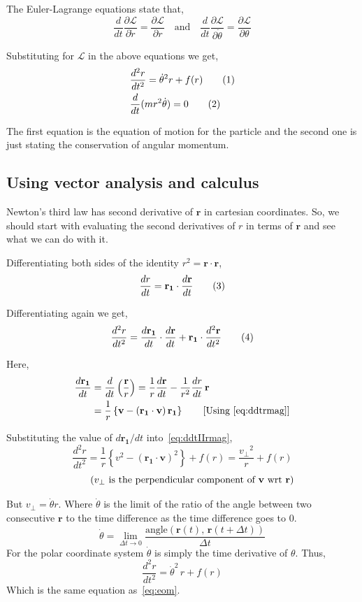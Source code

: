\documentclass[a4paper, 12pt]{article}
\renewcommand{\indent}{\hspace{3ex}}
\newcommand\labelthis[1]{\addtocounter{equation}{1}\tag{\theequation}\label{#1}}
\renewcommand{\r}{\mathbf{r}}
\newcommand{\ru}{\mathbf{r_1}}
\renewcommand{\v}{\mathbf{v}}
\newcommand{\ddt}[1]{\frac{d#1}{dt}}
\newcommand{\ddtII}[1]{\frac{d^2#1}{dt^2}}
\newcommand{\Lagr}{\mathcal{L}}
\begin{document}
The Euler-Lagrange equations state that,
\[	\ddt{} \frac{\partial \Lagr}{\partial \dot{r}} = \frac{\partial \Lagr}{\partial r} \quad\text{and}\quad
\ddt{} \frac{\partial \Lagr}{\partial \dot{\theta}} = \frac{\partial \Lagr}{\partial \theta} \]

Substituting for $\Lagr$ in the above equations we get,
\begin{align}
	&\ddtII{r} = \dot{\theta}^2 r + f(r) \labelthis{eq:eom} \\
	&\ddt{} (m r^2 \dot{\theta}) = 0 \labelthis{eq:conserv L lagrangian}
\end{align}

The first equation is the equation of motion for the particle and the second one is just stating the conservation of angular momentum.

\subsection{Using vector analysis and calculus}\label{eom vector calculus}

\indent Newton's third law has second derivative of $\r$ in cartesian coordinates. So, we should start with evaluating the second derivatives of $r$ in terms of $\r$ and see what we can do with it.

\medskip Differentiating both sides of the identity $r^2 = \r \cdot \r$,
\[ \ddt{r} = \ru \cdot \ddt{\r} \labelthis{eq:ddtrmag} \]

Differentiating again we get,
\[ \ddtII{r} = \ddt{\ru} \cdot \ddt{\r} + \ru \cdot \ddtII{\r} \labelthis{eq:ddtIIrmag} \]

Here,
\begin{align*}
	\ddt{\ru} &= \ddt{} \left( {\frac{\r}{r}} \right) = \frac{1}{r} \ddt{\r} - \frac{1}{r^2} \ddt{r} \, \r \\
			  &= \frac{1}{r} \left\{ \v - \left( \ru \cdot \v \right) \ru \right\} \tag*{[Using~\eqref{eq:ddtrmag}]}
\end{align*}

Substituting the value of $d\ru/dt$ into~\eqref{eq:ddtIIrmag},
\[ \ddtII{r} = \frac{1}{r} \left\{ v^2 - {\left( \ru \cdot \v \right)}^2 \right\} + f(r)
																					= \frac{{v_\bot}^2}{r} + f(r) \]
\[ \tag{$v_\bot$ is the perpendicular component of $\v$ wrt $\r$} \]

But $v_\bot = \dot{\theta} r$. Where $\dot{\theta}$ is the limit of the ratio of the angle between two consecutive $\r$ to the time difference as the time difference goes to $0$.
\[ \dot{\theta} = \lim_{\Delta t \to 0} \frac{\text{angle}(\r(t), \, \r(t + \Delta t))}{\Delta t} \]
For the polar coordinate system $\dot{\theta}$ is simply the time derivative of $\theta$.  Thus,
\[ \ddtII{r} = \dot{\theta}^2 \, r + f(r) \]
Which is the same equation as~\eqref{eq:eom}.
\end{document}
